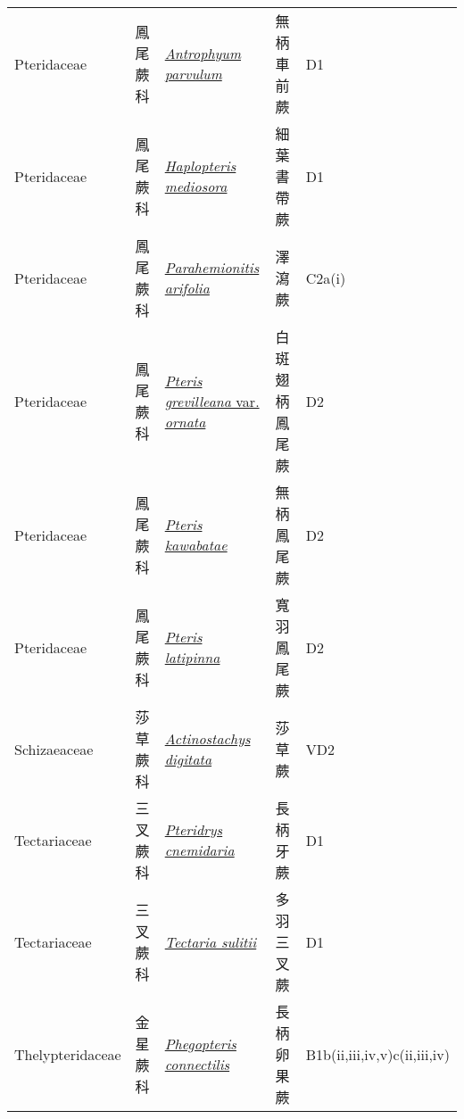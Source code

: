 {\begin{longtable}{p{2.5cm}p{2.5cm}p{4.5cm}p{2.5cm}p{3cm}}
    Pteridaceae & 鳳尾蕨科 & \href{http://www.theplantlist.org/tpl1.1/search?q=Antrophyum+parvulum}{\textit{Antrophyum parvulum} } & 無柄車前蕨 & D1 \index{Antrophyum@\textit{Antrophyum}!parvulum@\textit{parvulum}}  \index{無柄車前蕨} \\
    Pteridaceae & 鳳尾蕨科 & \href{http://www.theplantlist.org/tpl1.1/search?q=Haplopteris+mediosora}{\textit{Haplopteris mediosora} } & 細葉書帶蕨 & D1 \index{Haplopteris@\textit{Haplopteris}!mediosora@\textit{mediosora}}  \index{細葉書帶蕨} \\
    Pteridaceae & 鳳尾蕨科 & \href{http://www.theplantlist.org/tpl1.1/search?q=Parahemionitis+arifolia}{\textit{Parahemionitis arifolia} } & 澤瀉蕨 & C2a(i) \index{Parahemionitis@\textit{Parahemionitis}!arifolia@\textit{arifolia}}  \index{澤瀉蕨} \\
    Pteridaceae & 鳳尾蕨科 & \href{http://www.theplantlist.org/tpl1.1/search?q=Pteris+grevilleana+var.+ornata}{\textit{Pteris grevilleana} var. \textit{ornata} } & 白斑翅柄鳳尾蕨 & D2 \index{Pteris@\textit{Pteris}!grevilleana@\textit{grevilleana}!var. ornata@var. \textit{ornata}}  \index{白斑翅柄鳳尾蕨} \\
    Pteridaceae & 鳳尾蕨科 & \href{http://www.theplantlist.org/tpl1.1/search?q=Pteris+kawabatae}{\textit{Pteris kawabatae} } & 無柄鳳尾蕨 & D2 \index{Pteris@\textit{Pteris}!kawabatae@\textit{kawabatae}}  \index{無柄鳳尾蕨} \\
    Pteridaceae & 鳳尾蕨科 & \href{http://www.theplantlist.org/tpl1.1/search?q=Pteris+latipinna}{\textit{Pteris latipinna} } & 寬羽鳳尾蕨 & D2 \index{Pteris@\textit{Pteris}!latipinna@\textit{latipinna}}  \index{寬羽鳳尾蕨} \\
    Schizaeaceae & 莎草蕨科 & \href{http://www.theplantlist.org/tpl1.1/search?q=Actinostachys+digitata}{\textit{Actinostachys digitata} } & 莎草蕨 & VD2 \index{Actinostachys@\textit{Actinostachys}!digitata@\textit{digitata}}  \index{莎草蕨} \\
    Tectariaceae & 三叉蕨科 & \href{http://www.theplantlist.org/tpl1.1/search?q=Pteridrys+cnemidaria}{\textit{Pteridrys cnemidaria} } & 長柄牙蕨 & D1 \index{Pteridrys@\textit{Pteridrys}!cnemidaria@\textit{cnemidaria}}  \index{長柄牙蕨} \\
    Tectariaceae & 三叉蕨科 & \href{http://www.theplantlist.org/tpl1.1/search?q=Tectaria+sulitii}{\textit{Tectaria sulitii} } & 多羽三叉蕨 & D1 \index{Tectaria@\textit{Tectaria}!sulitii@\textit{sulitii}}  \index{多羽三叉蕨} \\
    Thelypteridaceae & 金星蕨科 & \href{http://www.theplantlist.org/tpl1.1/search?q=Phegopteris+connectilis}{\textit{Phegopteris connectilis} } & 長柄卵果蕨 & B1b(ii,iii,iv,v)c(ii,iii,iv) \index{Phegopteris@\textit{Phegopteris}!connectilis@\textit{connectilis}}  \index{長柄卵果蕨} \\

\end{longtable}}
